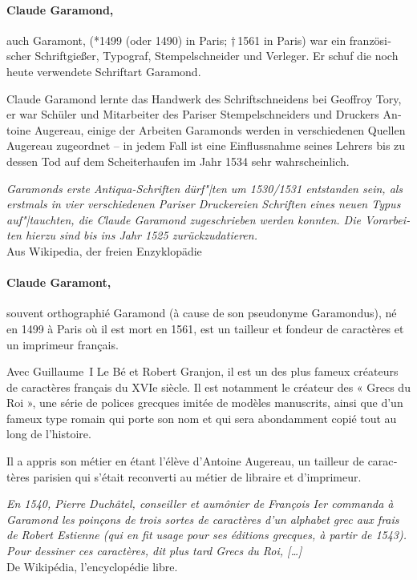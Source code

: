 \documentclass[pagesize,DIV14]{scrartcl}
\begin{document}
\begin{multicols}{2}
\begin{german}
\paragraph*{Claude Garamond,} auch Garamont, (*1499 (oder 1490) in Paris; †\,1561 in Paris) war ein französischer Schriftgießer, Typograf, Stempelschneider und Verleger. Er schuf die noch heute verwendete Schriftart Garamond.

Claude Garamond lernte das Handwerk des Schriftschneidens bei Geoffroy Tory, er war Schüler und Mitarbeiter des Pariser Stempelschneiders und Druckers Antoine Augereau, einige der Arbeiten Garamonds werden in verschiedenen Quellen Augereau zugeordnet – in jedem Fall ist eine Einflussnahme seines Lehrers bis zu dessen Tod auf dem Scheiterhaufen im Jahr 1534 sehr wahrscheinlich.

\textit{Garamonds erste Antiqua-Schriften dürf"|ten um 1530/1531 entstanden sein, als erstmals in vier verschiedenen Pariser Druckereien Schriften eines neuen Typus auf"|tauchten, die Claude Garamond zugeschrieben werden konnten. Die Vorarbeiten hierzu sind bis ins Jahr 1525 zurückzudatieren.}\\
{\scriptsize Aus Wikipedia, der freien Enzyklopädie}
\end{german}

\begin{french}
\paragraph*{Claude Garamont,} souvent orthographié Garamond (à cause de son pseudonyme Garamondus), né en 1499 à Paris où il est mort en 1561, est un tailleur et fondeur de caractères et un imprimeur français.

Avec Guillaume~I Le Bé et Robert Granjon, il est un des plus fameux créateurs de caractères français du {XVI{e}} siècle. Il est notamment le créateur des « Grecs du Roi », une série de polices grecques imitée de modèles manuscrits, ainsi que d’un fameux type romain qui porte son nom et qui sera abondamment copié tout au long de l’histoire.

Il a appris son métier en étant l’élève d’Antoine Augereau, un tailleur de caractères parisien qui s’était reconverti au métier de libraire et d’imprimeur.

\textit{En 1540, Pierre Duchâtel, conseiller et aumônier de François I{er} commanda à Garamond les poinçons de trois sortes de caractères d’un alphabet grec aux frais de Robert Estienne (qui en fit usage pour ses éditions grecques, à partir de 1543). Pour dessiner ces caractères, dit plus tard Grecs du Roi, […]}\\
{\scriptsize De Wikipédia, l'encyclopédie libre.}
\end{french}


\end{multicols}
\end{document}
